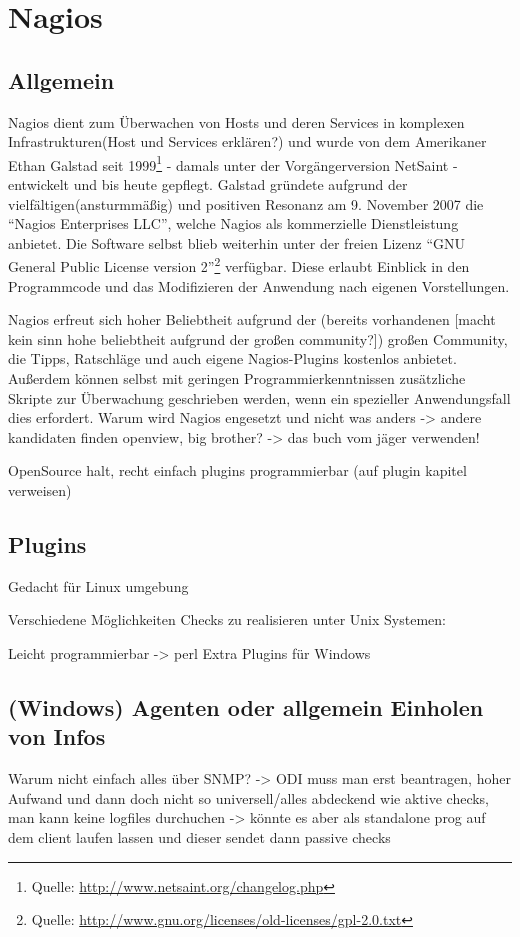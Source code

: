 \section{Nagios}

\subsection{Allgemein}
Nagios dient zum Überwachen von Hosts und deren Services in komplexen Infrastrukturen(Host und Services erklären?) und wurde von dem Amerikaner Ethan Galstad seit 1999\footnote{Quelle: \url{http://www.netsaint.org/changelog.php}} - damals unter der Vorgängerversion NetSaint - entwickelt und bis heute gepflegt.
Galstad gründete aufgrund der vielfältigen(ansturmmäßig) und positiven Resonanz am 9. November 2007 die "`Nagios Enterprises LLC"', welche Nagios als kommerzielle Dienstleistung anbietet.
Die Software selbst blieb weiterhin unter der freien Lizenz "`GNU General Public License version 2"'\footnote{Quelle: \url{http://www.gnu.org/licenses/old-licenses/gpl-2.0.txt}} verfügbar.
Diese erlaubt Einblick in den Programmcode und das Modifizieren der Anwendung nach eigenen Vorstellungen.

Nagios erfreut sich hoher Beliebtheit aufgrund der (bereits vorhandenen [macht kein sinn hohe beliebtheit aufgrund der großen community?]) großen Community, die Tipps, Ratschläge und auch eigene Nagios-Plugins kostenlos anbietet.
Außerdem können selbst mit geringen Programmierkenntnissen zusätzliche Skripte zur Überwachung geschrieben werden, wenn ein spezieller Anwendungsfall dies erfordert.
Warum wird Nagios engesetzt und nicht was anders -> andere kandidaten finden openview, big brother? -> das buch vom jäger verwenden!

OpenSource halt, recht einfach plugins programmierbar (auf plugin kapitel verweisen)





\subsection{Plugins}
Gedacht für Linux umgebung

Verschiedene Möglichkeiten Checks zu realisieren unter Unix Systemen:

Leicht programmierbar -> perl
Extra Plugins für Windows

\subsection{(Windows) Agenten oder allgemein Einholen von Infos}
Warum nicht einfach alles über SNMP? -> ODI muss man erst beantragen, hoher Aufwand und dann doch nicht so universell/alles abdeckend wie aktive checks, man kann keine logfiles durchuchen -> könnte es aber als standalone prog auf dem client laufen lassen und dieser sendet dann passive checks


